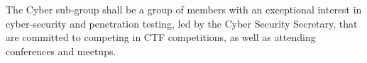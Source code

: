 \begin{clause}  
  The Cyber sub-group shall be a group of members with an exceptional interest in cyber-security and penetration testing, led by the Cyber Security Secretary, that are committed to competing in CTF competitions, as well as attending conferences and meetups.
\end{clause}
